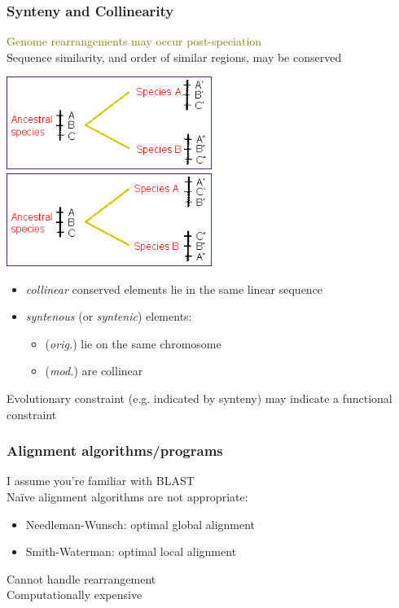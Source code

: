 %
\begin{frame}
  \frametitle{Synteny and Collinearity}
  \textcolor{olive}{Genome rearrangements may occur post-speciation} \\
  Sequence similarity, and order of similar regions, may be conserved
  \begin{center}
    \includegraphics[width=0.5\textwidth]{images/collinear}    
    \includegraphics[width=0.5\textwidth]{images/synteny}
  \end{center}    
  \begin{itemize}
    \item \textcolor{hutton_blue}{\textit{collinear}} conserved elements lie in the same linear sequence
    \item \textcolor{hutton_purple}{\textit{syntenous} (or \textit{syntenic})} elements:
    \begin{itemize}
      \item (\textit{orig.}) lie on the same chromosome
      \item (\textit{mod.}) are collinear
    \end{itemize}
  \end{itemize}
  Evolutionary constraint (e.g. indicated by synteny) may indicate a functional constraint
\end{frame}

%
\begin{frame}
  \frametitle{Alignment algorithms/programs}
  \textcolor{hutton_green}{I assume you're familiar with BLAST} \\
  \textcolor{RawSienna}{Na\"{i}ve alignment algorithms are not appropriate}:
  \begin{itemize}
    \item Needleman-Wunsch: optimal global alignment
    \item Smith-Waterman: optimal local alignment
  \end{itemize}
  \textcolor{hutton_blue}{Cannot handle rearrangement} \\
  \textcolor{hutton_purple}{Computationally expensive}  
\end{frame}

